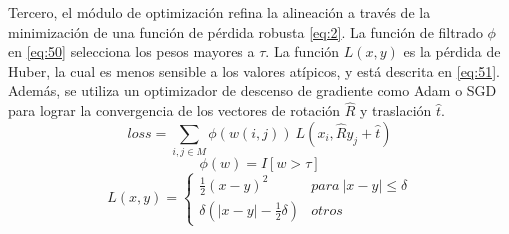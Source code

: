 Tercero, el módulo de optimización refina la alineación a través de la minimización de una función de pérdida robusta \ref{eq:2}. La función de filtrado $\phi$ en \ref{eq:50} selecciona los pesos mayores a $\tau$. La función $L(x, y)$ es la pérdida de Huber, la cual es menos sensible a los valores atípicos, y está descrita en \ref{eq:51}. Además, se utiliza un optimizador de descenso de gradiente como Adam o SGD para lograr la convergencia de los vectores de rotación $\hat{R}$ y traslación $\hat{t}$. \\
\begin{equation} \label{eq:2}
    loss = \sum_{i,j \in M} \phi(w(i,j)) \ L(x_i, \hat{R}y_{j} + \hat{t})
\end{equation}
\begin{equation} \label{eq:50}
    \phi(w) = I[w > \tau]
\end{equation}
\begin{equation} \label{eq:51}
    L(x, y) = 
    \begin{cases}
      \frac{1}{2}(x-y)^2 & para \ |x-y| \leq \delta \\
      \delta(|x-y| - \frac{1}{2}\delta) & otros 
    \end{cases} 
\end{equation}

